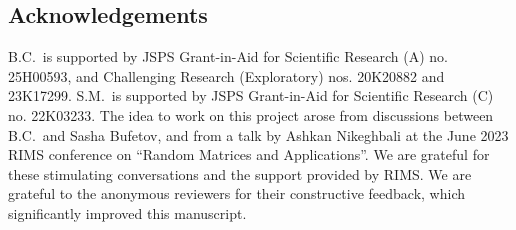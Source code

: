 \documentclass[10pt,a4paper]{amsart}
\numberwithin{equation}{section}
\theoremstyle{definition}
\begin{document}
\subsection*{Acknowledgements}

B.C.\ is supported by JSPS Grant-in-Aid for Scientific Research (A) no. 25H00593, and Challenging Research (Exploratory) nos. 20K20882 and 23K17299.
S.M.\ is supported by JSPS Grant-in-Aid for Scientific Research (C) no. 22K03233.
The idea to work on this project arose from discussions between B.C.\ and Sasha Bufetov, and from a talk by Ashkan Nikeghbali at the June 2023 RIMS conference on ``Random Matrices and Applications''.
We are grateful for these stimulating conversations and the support provided by RIMS.
We are grateful to the anonymous reviewers for their constructive feedback, which significantly improved this manuscript.

\end{document}
